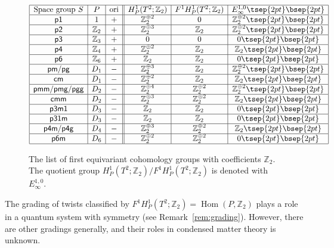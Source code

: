 \documentclass[pdftex]{sigma}
\theoremstyle{definition}
\newcommand{\Z}{\mathbb{Z}}
\begin{document}
\begin{figure}[!h]
$$
\begin{array}{|c|c|c||c|c|c|}
\hline
\mbox{Space group $S$} & P & \mbox{ori} &
H^1_P(T^2; \Z_2) & F^1H^1_P(T^2; \Z_2) & E_\infty^{1, 0} \tsep{2pt}\bsep{2pt}\\
\hline
\mbox{\textsf{p1}} & 1 & + &
\Z_2^{\oplus 2} & 0 & \Z_2^{\oplus 2} \tsep{2pt}\bsep{2pt}\\
\hline
\mbox{\textsf{p2}} & \Z_2 & + &
\Z_2^{\oplus 3} & \Z_2 & \Z_2^{\oplus 2} \tsep{2pt}\bsep{2pt}\\
\hline
\mbox{\textsf{p3}} & \Z_3 & + &
0 & 0 & 0 \tsep{2pt}\bsep{2pt}\\
\hline
\mbox{\textsf{p4}} & \Z_4 & + &
\Z_2^{\oplus 2} & \Z_2 & \Z_2 \tsep{2pt}\bsep{2pt}\\
\hline
\mbox{\textsf{p6}} & \Z_6 & + &
\Z_2 & \Z_2 & 0 \tsep{2pt}\bsep{2pt}\\
\hline
\mbox{\textsf{pm}/\textsf{pg}} & D_1 & - &
\Z_2^{\oplus 3} & \Z_2 & \Z_2^{\oplus 2} \tsep{2pt}\bsep{2pt}\\
\hline
\mbox{\textsf{cm}} & D_1 & - &
\Z_2^{\oplus 2} & \Z_2 & \Z_2 \tsep{2pt}\bsep{2pt}\\
\hline
\mbox{\textsf{pmm}/\textsf{pmg}/\textsf{pgg}} & D_2 & - &
\Z_2^{\oplus 4} & \Z_2^{\oplus 2} & \Z_2^{\oplus 2} \tsep{2pt}\bsep{2pt}\\
\hline
\mbox{\textsf{cmm}} & D_2 & - &
\Z_2^{\oplus 3} & \Z_2^{\oplus 2} & \Z_2 \tsep{2pt}\bsep{2pt}\\
\hline
\mbox{\textsf{p3m1}} & D_3 & - &
\Z_2 & \Z_2 & 0 \tsep{2pt}\bsep{2pt}\\
\hline
\mbox{\textsf{p31m}} & D_3 & - &
\Z_2 & \Z_2 & 0 \tsep{2pt}\bsep{2pt}\\
\hline
\mbox{\textsf{p4m}/\textsf{p4g}} & D_4 & - &
\Z_2^{\oplus 3} & \Z_2^{\oplus 2} & \Z_2 \tsep{2pt}\bsep{2pt}\\
\hline
\mbox{\textsf{p6m}} & D_6 & - &
\Z_2^{\oplus 2} & \Z_2^{\oplus 2} & 0 \tsep{2pt}\bsep{2pt}\\
\hline
\end{array}
$$
\caption{The list of f\/irst equivariant cohomology groups with coef\/f\/icients $\Z_2$. The quotient group $H^1_P(T^2; \Z_2)/F^1H^1_P(T^2; \Z_2)$ is denoted with $E_\infty^{1, 0}$.}\label{fig:list_equiv_coh_Z2}
\end{figure}

The grading of twists classif\/ied by $F^1H^1_P(T^2; \Z_2) = \operatorname{Hom}(P, \Z_2)$ plays a role in a quantum system with symmetry (see Remark~\ref{rem:grading}). However, there are other gradings generally, and their roles in condensed matter theory is unknown.
\end{document}
